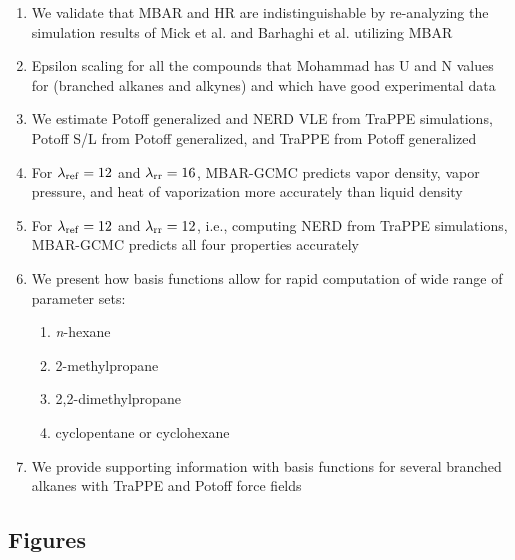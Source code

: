 \documentclass[journal=jced,manuscript=article]{achemso}
\begin{document}
\begin{enumerate}
	\item We validate that MBAR and HR are indistinguishable by re-analyzing the simulation results of Mick et al. and Barhaghi et al. utilizing MBAR
	\item Epsilon scaling for all the compounds that Mohammad has U and N values for (branched alkanes and alkynes) and which have good experimental data
	\item We estimate Potoff generalized and NERD VLE from TraPPE simulations, Potoff S/L from Potoff generalized, and TraPPE from Potoff generalized
	\item For $\lambda_{\rm ref} = 12$ and $\lambda_{\rm rr} = 16$, MBAR-GCMC predicts vapor density, vapor pressure, and heat of vaporization more accurately than liquid density
	\item For $\lambda_{\rm ref} = 12$ and $\lambda_{\rm rr} = 12$, i.e., computing NERD from TraPPE simulations, MBAR-GCMC predicts all four properties accurately    
	\item We present how basis functions allow for rapid computation of wide range of parameter sets:
	\begin{enumerate}
		\item \textit{n}-hexane
		\item 2-methylpropane
		\item 2,2-dimethylpropane
		\item cyclopentane or cyclohexane
	\end{enumerate}
	\item We provide supporting information with basis functions for several branched alkanes with TraPPE and Potoff force fields
\end{enumerate}

\subsection{Figures}
\end{document}
